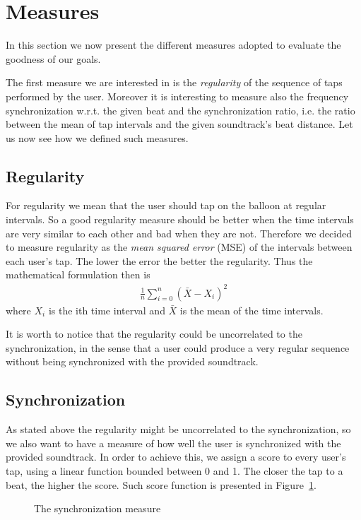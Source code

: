 \section{Measures}
\label{sec:measures}
In this section we now present the different measures adopted to evaluate the goodness of our goals.

The first measure we are interested in is the \emph{regularity} of the sequence of taps performed by the user. Moreover it is interesting to measure also the frequency synchronization w.r.t. the given beat and the synchronization ratio, i.e. the ratio between the mean of tap intervals and the given soundtrack's beat distance.
Let us now see how we defined such measures.
\subsection{Regularity}
For regularity we mean that the user should tap on the balloon at regular intervals. So a good regularity measure should be better when the time intervals are very similar to each other and bad when they are not. Therefore we decided to measure regularity as the \emph{mean squared error} (MSE) of the intervals between each user's tap.
The lower the error the better the regularity.
Thus the mathematical formulation then is
\begin{align}
	\frac{1}{n}\displaystyle\sum\limits_{i=0}^n(\bar{X}-X_i)^2
\end{align}
where $X_i$ is the ith time interval and $\bar{X}$ is the mean of the time intervals.

It is worth to notice that the regularity could be uncorrelated to the synchronization, in the sense that a user could produce a very regular sequence without being synchronized with the provided soundtrack.

\subsection{Synchronization}
As stated above the regularity might be uncorrelated to the synchronization, so we also want to have a measure of how well the user is synchronized with the provided soundtrack.
In order to achieve this, we assign a score to every user's tap, using a linear function bounded between 0 and 1. The closer the tap to a beat, the higher the score. Such score function is presented in Figure~\ref{fig:sync-measure}.
\begin{figure}[h!t]
\centering
	{\setlength{\fboxsep}{1.5pt}
	 }
\caption{The synchronization measure}
\label{fig:sync-measure}
\end{figure}

